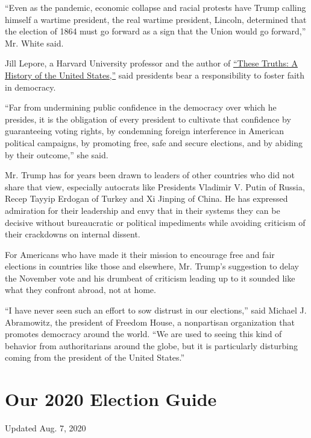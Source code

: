 ``Even as the pandemic, economic collapse and racial protests have Trump
calling himself a wartime president, the real wartime president,
Lincoln, determined that the election of 1864 must go forward as a sign
that the Union would go forward,'' Mr. White said.

Jill Lepore, a Harvard University professor and the author of
\href{https://www.nytimes.com/2018/09/14/books/review/jill-lepore-these-truths.html}{``These
Truths: A History of the United States,''} said presidents bear a
responsibility to foster faith in democracy.

``Far from undermining public confidence in the democracy over which he
presides, it is the obligation of every president to cultivate that
confidence by guaranteeing voting rights, by condemning foreign
interference in American political campaigns, by promoting free, safe
and secure elections, and by abiding by their outcome,'' she said.

Mr. Trump has for years been drawn to leaders of other countries who did
not share that view, especially autocrats like Presidents Vladimir V.
Putin of Russia, Recep Tayyip Erdogan of Turkey and Xi Jinping of China.
He has expressed admiration for their leadership and envy that in their
systems they can be decisive without bureaucratic or political
impediments while avoiding criticism of their crackdowns on internal
dissent.

For Americans who have made it their mission to encourage free and fair
elections in countries like those and elsewhere, Mr. Trump's suggestion
to delay the November vote and his drumbeat of criticism leading up to
it sounded like what they confront abroad, not at home.

``I have never seen such an effort to sow distrust in our elections,''
said Michael J. Abramowitz, the president of Freedom House, a
nonpartisan organization that promotes democracy around the world. ``We
are used to seeing this kind of behavior from authoritarians around the
globe, but it is particularly disturbing coming from the president of
the United States.''

\hypertarget{our-2020-election-guide}{%
\section{Our 2020 Election Guide}\label{our-2020-election-guide}}

Updated Aug. 7, 2020

